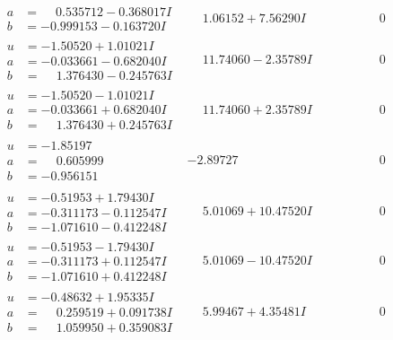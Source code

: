 \documentclass[1p]{elsarticle_modified}
\theoremstyle{definition}
\begin{document}
$$\begin{array}{c|c|c}
\begin{aligned}
a &= \phantom{-}0.535712 - 0.368017 I \\
b &= -0.999153 - 0.163720 I\end{aligned}
 & \phantom{-}1.06152 + 7.56290 I & \phantom{-0.000000 } 0 \\ \hline\begin{aligned}
u &= -1.50520 + 1.01021 I \\
a &= -0.033661 - 0.682040 I \\
b &= \phantom{-}1.376430 - 0.245763 I\end{aligned}
 & \phantom{-}11.74060 - 2.35789 I & \phantom{-0.000000 } 0 \\ \hline\begin{aligned}
u &= -1.50520 - 1.01021 I \\
a &= -0.033661 + 0.682040 I \\
b &= \phantom{-}1.376430 + 0.245763 I\end{aligned}
 & \phantom{-}11.74060 + 2.35789 I & \phantom{-0.000000 } 0 \\ \hline\begin{aligned}
u &= -1.85197\phantom{ +0.000000I} \\
a &= \phantom{-}0.605999\phantom{ +0.000000I} \\
b &= -0.956151\phantom{ +0.000000I}\end{aligned}
 & -2.89727\phantom{ +0.000000I} & \phantom{-0.000000 } 0 \\ \hline\begin{aligned}
u &= -0.51953 + 1.79430 I \\
a &= -0.311173 - 0.112547 I \\
b &= -1.071610 - 0.412248 I\end{aligned}
 & \phantom{-}5.01069 + 10.47520 I & \phantom{-0.000000 } 0 \\ \hline\begin{aligned}
u &= -0.51953 - 1.79430 I \\
a &= -0.311173 + 0.112547 I \\
b &= -1.071610 + 0.412248 I\end{aligned}
 & \phantom{-}5.01069 - 10.47520 I & \phantom{-0.000000 } 0 \\ \hline\begin{aligned}
u &= -0.48632 + 1.95335 I \\
a &= \phantom{-}0.259519 + 0.091738 I \\
b &= \phantom{-}1.059950 + 0.359083 I\end{aligned}
 & \phantom{-}5.99467 + 4.35481 I & \phantom{-0.000000 } 0 \\ \hline\begin{aligned}

\end{aligned}
\end{array}$$
\end{document}
